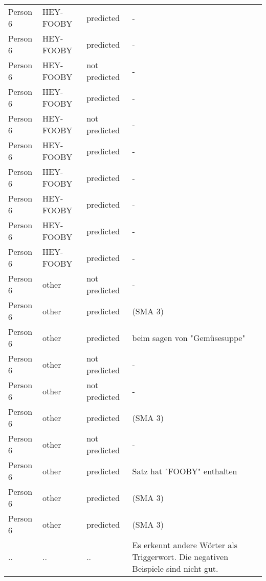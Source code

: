 \documentclass[main.tex]{subfiles} %
\begin{document}
\begin{longtable}{|p{3cm}|p{3cm}|p{3cm}|p{6cm}|}
    Person 6 & HEY-FOOBY & predicted & - \\
    Person 6 & HEY-FOOBY & predicted & - \\
    Person 6 & HEY-FOOBY & not predicted & - \\
    Person 6 & HEY-FOOBY & predicted & - \\
    Person 6 & HEY-FOOBY & not predicted & - \\
    Person 6 & HEY-FOOBY & predicted & - \\
    Person 6 & HEY-FOOBY & predicted & - \\
    Person 6 & HEY-FOOBY & predicted & - \\
    Person 6 & HEY-FOOBY & predicted & - \\
    Person 6 & HEY-FOOBY & predicted & - \\
    
    Person 6 & other & not predicted & - \\
    Person 6 & other & predicted & (SMA 3) \\
    Person 6 & other & predicted & beim sagen von "Gemüsesuppe" \\
    Person 6 & other & not predicted & - \\
    Person 6 & other & not predicted & - \\
    Person 6 & other & predicted & (SMA 3) \\
    Person 6 & other & not predicted & - \\
    Person 6 & other & predicted & Satz hat "FOOBY" enthalten \\
    Person 6 & other & predicted & (SMA 3) \\
    Person 6 & other & predicted & (SMA 3) \\
    .. & .. & .. & Es erkennt andere Wörter als Triggerwort. Die negativen Beispiele sind nicht gut. \\
    \bottomrule
\end{longtable}
\end{document}
